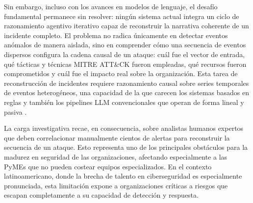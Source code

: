 Sin embargo, incluso con los avances en modelos de lenguaje, el desafío fundamental permanece sin resolver: ningún sistema actual integra un ciclo de razonamiento agentivo iterativo capaz de reconstruir la narrativa coherente de un incidente completo. El problema no radica únicamente en detectar eventos anómalos de manera aislada, sino en comprender cómo una secuencia de eventos dispersos configura la cadena causal de un ataque: cuál fue el vector de entrada, qué tácticas y técnicas MITRE ATT\&CK fueron empleadas, qué recursos fueron comprometidos y cuál fue el impacto real sobre la organización. Esta tarea de reconstrucción de incidentes requiere razonamiento causal sobre series temporales de eventos heterogéneos, una capacidad de la que carecen los sistemas basados en reglas y también los pipelines LLM convencionales que operan de forma lineal y pasiva \cite{hassan2026elisar}.

La carga investigativa recae, en consecuencia, sobre analistas humanos expertos que deben correlacionar manualmente cientos de alertas para reconstruir la secuencia de un ataque. Esto representa uno de los principales obstáculos para la madurez en seguridad de las organizaciones, afectando especialmente a las PyMEs que no pueden costear equipos especializados. En el contexto latinoamericano, donde la brecha de talento en ciberseguridad es especialmente pronunciada, esta limitación expone a organizaciones críticas a riesgos que escapan completamente a su capacidad de detección y respuesta.

